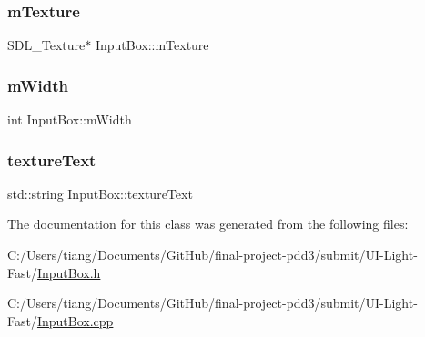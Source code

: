 \subsubsection{\texorpdfstring{m\+Texture}{mTexture}}
{\footnotesize\ttfamily S\+D\+L\+\_\+\+Texture$\ast$ Input\+Box\+::m\+Texture\hspace{0.3cm}{\ttfamily [private]}}

\mbox{\label{class_input_box_a2f409469e712032ebafe5df6c6505ef6}} 
\subsubsection{\texorpdfstring{m\+Width}{mWidth}}
{\footnotesize\ttfamily int Input\+Box\+::m\+Width\hspace{0.3cm}{\ttfamily [private]}}

\mbox{\label{class_input_box_a484ab55097789bae12b3c6e4264f836e}} 
\subsubsection{\texorpdfstring{texture\+Text}{textureText}}
{\footnotesize\ttfamily std\+::string Input\+Box\+::texture\+Text}



The documentation for this class was generated from the following files\+:\begin{DoxyCompactItemize}
\item 
C\+:/\+Users/tiang/\+Documents/\+Git\+Hub/final-\/project-\/pdd3/submit/\+U\+I-\/\+Light-\/\+Fast/\mbox{\hyperlink{_input_box_8h}{Input\+Box.\+h}}\item 
C\+:/\+Users/tiang/\+Documents/\+Git\+Hub/final-\/project-\/pdd3/submit/\+U\+I-\/\+Light-\/\+Fast/\mbox{\hyperlink{_input_box_8cpp}{Input\+Box.\+cpp}}\end{DoxyCompactItemize}

